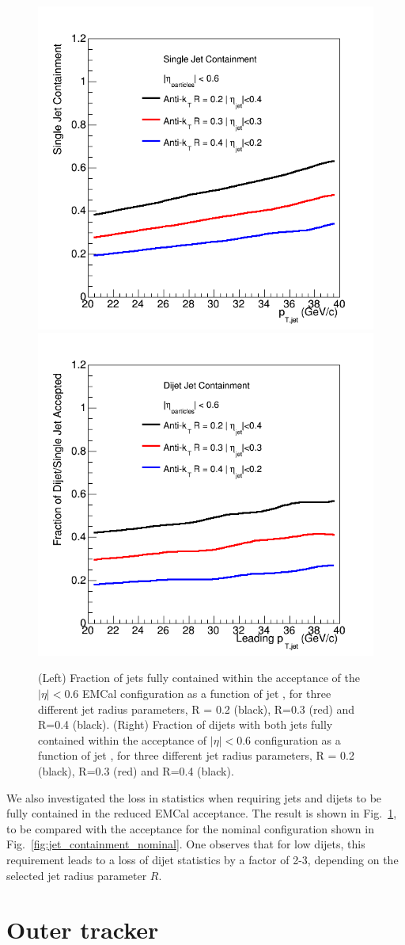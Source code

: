 \begin{figure}[hbt]
  \centering
  \includegraphics[width=0.4\linewidth]{figs/SingleJet_eta_ecal06}
  \hspace{0.1\linewidth}  \includegraphics[width=0.4\linewidth]{figs/Dijet_eta_ecal06}
  \caption{(Left)
  Fraction of jets fully contained within the acceptance of the $|\eta| < 0.6$ EMCal configuration as a function
  of jet \pt, for three different jet radius parameters, R = 0.2 (black), R=0.3 (red) and R=0.4 (black).
   (Right)
  Fraction of dijets with both jets fully contained within the acceptance of $|\eta| < 0.6$ configuration as a function
  of jet \pt, for three different jet radius parameters, R = 0.2 (black), R=0.3 (red) and R=0.4 (black).}
  \label{fig:jet_containment_reduced_emcal}
\end{figure}

We also investigated the loss in statistics when requiring jets and dijets to be fully contained in the reduced EMCal acceptance. The result is shown 
in Fig.~\ref{fig:jet_containment_reduced_emcal}, to be compared with the acceptance for the nominal 
configuration shown in Fig.~\ref{fig:jet_containment_nominal}. One observes that for low \pt dijets, this requirement leads to a loss of dijet
statistics by a factor of 2-3, depending on the selected jet radius parameter $R$.

\section{Outer tracker}

